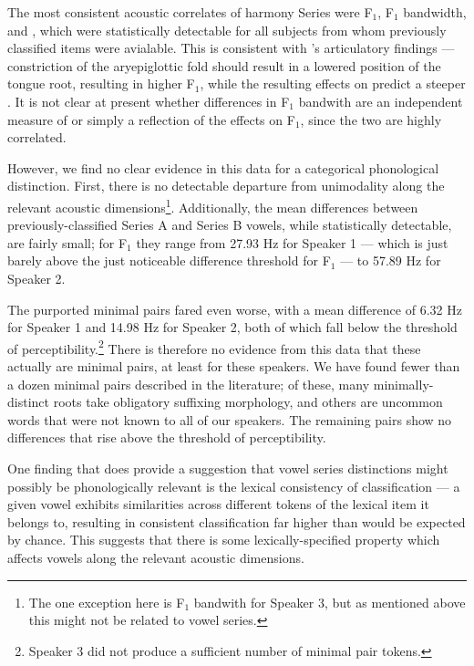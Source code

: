 \documentclass[output=paper
,newtxmath
,modfonts
,nonflat]{langsci/langscibook}
\begin{document}
The most consistent acoustic correlates of harmony Series were F$_1$, F$_1$ bandwidth, and , which were statistically detectable for all subjects from whom previously classified items were avialable.  This is consistent with \cite{Edmondsonetal2004}'s articulatory findings --- constriction of the aryepiglottic fold should result in a lowered position of the tongue root, resulting in higher F$_1$, while the resulting effects on  predict a steeper .  It is not clear at present whether differences in F$_1$ bandwith are an independent measure of  or simply a reflection of the effects on F$_1$, since the two are highly correlated.  

However, we find no clear evidence in this data for a categorical phonological distinction.  First, there is no detectable departure from unimodality along the relevant acoustic dimensions\footnote{The one exception here is F$_1$ bandwith for Speaker 3, but as mentioned above this might not be related to vowel series.}.  Additionally, the mean differences between previously-classified Series A and Series B vowels, while statistically detectable, are fairly small; for F$_1$ they range from 27.93 Hz for Speaker 1 ---  which is just barely above the just noticeable difference threshold for F$_1$ \citep{KewleyPort1995} --- to 57.89 Hz for Speaker 2.  

The purported minimal pairs fared even worse, with a mean difference of 6.32 Hz for Speaker 1 and 14.98 Hz for Speaker 2, both of which fall below the threshold of perceptibility.\footnote{Speaker 3 did not produce a sufficient number of minimal pair tokens.}  There is therefore no evidence from this data that these actually are minimal pairs, at least for these speakers.  We have found fewer than a dozen minimal pairs described in the literature; of these, many minimally-distinct roots take obligatory suffixing morphology, and others are uncommon words that were not known to all of our speakers.  The remaining pairs show no differences that rise above the threshold of perceptibility.

One finding that does provide a suggestion that vowel series distinctions might possibly be phonologically relevant is the lexical consistency of classification --- a given vowel exhibits similarities across different tokens of the lexical item it belongs to, resulting in consistent classification far higher than would be expected by chance.  This suggests that there is some lexically-specified property which affects vowels along the relevant acoustic dimensions. 
\end{document}
